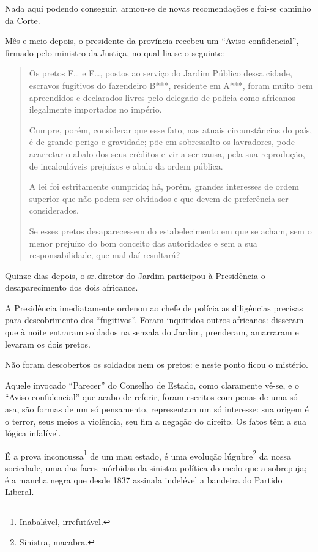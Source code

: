 {Nada aqui podendo conseguir, armou-se de novas recomendações e foi-se
caminho da Corte.

Mês e meio depois, o presidente da província recebeu um ``Aviso
confidencial'', firmado pelo ministro da Justiça, no qual lia-se o
seguinte:

\begin{quote}
Os pretos F\ldots{} e F\ldots{}, postos ao serviço do Jardim Público dessa
cidade, escravos fugitivos do fazendeiro B***, residente em A***, foram
muito bem apreendidos e declarados livres pelo delegado de polícia como
africanos ilegalmente importados no império.

Cumpre, porém, considerar que esse fato, nas atuais circunstâncias do
país, é de grande perigo e gravidade; põe em sobressalto os lavradores,
pode acarretar o abalo dos seus créditos e vir a ser causa, pela sua
reprodução, de incalculáveis prejuízos e abalo da ordem pública.

A lei foi estritamente cumprida; há, porém, grandes interesses de ordem
superior que não podem ser olvidados e que devem de preferência ser
considerados.

Se esses pretos desaparecessem do estabelecimento em que se acham, sem o
menor prejuízo do bom conceito das autoridades e sem a sua
responsabilidade, que mal daí resultará?
\end{quote}

\noindent\dotfill{}

Quinze dias depois, o sr.\,diretor do Jardim participou à Presidência o
desaparecimento dos dois africanos.

A Presidência imediatamente ordenou ao chefe de polícia as diligências
precisas para descobrimento dos ``fugitivos''. Foram inquiridos outros
africanos: disseram que à noite entraram soldados na senzala do Jardim,
prenderam, amarraram e levaram os dois pretos.

Não foram descobertos os soldados nem os pretos: e neste ponto ficou o
mistério.

Aquele invocado ``Parecer'' do Conselho de Estado, como claramente vê-se,
e o ``Aviso-confidencial'' que acabo de referir, foram escritos com penas
de uma só asa, são formas de um só pensamento, representam um só
interesse: sua origem é o terror, seus meios a violência, seu fim a
negação do direito. Os fatos têm a sua lógica infalível.

É a prova inconcussa\footnote{Inabalável, irrefutável.} de um mau
estado, é uma evolução lúgubre\footnote{Sinistra, macabra.}
da nossa sociedade, uma das
faces mórbidas da sinistra política do medo que a sobrepuja; é a mancha
negra que desde 1837 assinala indelével a bandeira do Partido Liberal.

}
